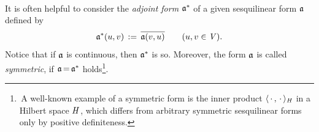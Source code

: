 \documentclass[11pt,twoside]{article}
\begin{document}

\paragraph*{} %
It is often helpful to consider the \textit{adjoint form} $\mathfrak{a}^*$
of a given sesquilinear form $\mathfrak{a}$ defined by
\[
\mathfrak{a}^* (u,v) \,:=\, \overline{\mathfrak{a}(v,u)}
\quad \quad (u,v \in \mathit{V}).
\]
Notice that if $\mathfrak{a}$ is continuous,
then $\mathfrak{a}^*$ is so.
Moreover,
the form $\mathfrak{a}$ is called \textit{symmetric},
if $\mathfrak{a} {\,=\,} \mathfrak{a}^*$ holds\footnote{
\,A well-known example of a symmetric form is the inner product
$\langle \,\cdot\,,\,\cdot\, \rangle_{\mathit{H}}$ in a Hilbert space $\mathit{H}$,
which differs from arbitrary symmetric sesquilinear forms
only by positive definiteness.}.
\end{document}
